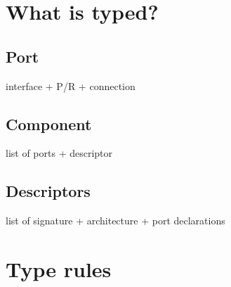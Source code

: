 \section{What is typed?}
\subsection{Port}
interface + P/R + connection
\subsection{Component}
list of ports + descriptor
\subsection{Descriptors}
list of signature + architecture + port declarations

\section{Type rules}

